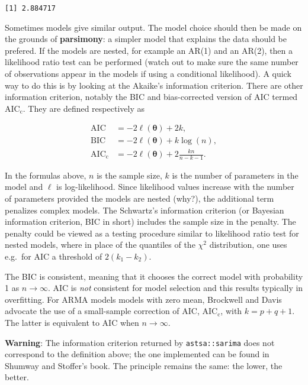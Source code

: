 \documentclass[]{book}
\begin{document}
\begin{verbatim}
[1] 2.884717
\end{verbatim}

Sometimes models give similar output. The model choice should then be made on the grounds of \textbf{parsimony}: a simpler model that explains the data should be prefered. If the models are nested, for example an AR(1) and an AR(2), then a likelihood ratio test can be performed (watch out to make sure the same number of observations appear in the models if using a conditional likelihood). A quick way to do this is by looking at the Akaike's information criterion. There are other information criterion, notably the BIC and bias-corrected version of AIC termed \(\mathrm{AIC}_{\mathrm{c}}\). They are defined respectively as

\begin{align*}
\mathrm{AIC}& = -2\ell(\boldsymbol{\theta})+2k,\\
\mathrm{BIC}& = -2\ell(\boldsymbol{\theta})+k\log(n),\\
\mathrm{AIC}_{\mathrm{c}}& = -2\ell(\boldsymbol{\theta})+2 \frac{kn}{n-k-1}.
\end{align*}

In the formulas above, \(n\) is the sample size, \(k\) is the number of parameters in the model and \(\ell\) is log-likelihood. Since likelihood values increase with the number of parameters provided the models are nested (why?), the additional term penalizes complex models. The Schwartz's information criterion (or Bayesian information criterion, BIC in short) includes the sample size in the penalty. The penalty could be viewed as a testing procedure similar to likelihood ratio test for nested models, where in place of the quantiles of the \(\chi^2\) distribution, one uses e.g.~for AIC a threshold of \(2(k_1-k_2)\).

The BIC is consistent, meaning that it chooses the correct model with probability 1 as \(n \to \infty\). AIC is \emph{not} consistent for model selection and this results typically in overfitting. For ARMA models models with zero mean, Brockwell and Davis advocate the use of a small-sample correction of AIC, AIC\(_\mathrm{c}\), with \(k = p+q+1\). The latter is equivalent to AIC when \(n \to \infty\).

\textbf{Warning}: The information criterion returned by \texttt{astsa::sarima} does not correspond to the definition above; the one implemented can be found in Shumway and Stoffer's book. The principle remains the same: the lower, the better.
\end{document}

